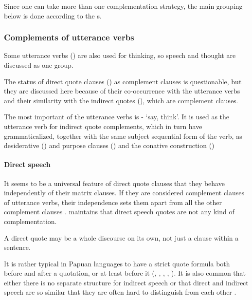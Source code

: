 Since one  can take more than one complementation strategy, the main grouping below is done according to the s.

\subsubsection{Complements of utterance verbs} \label{sec:8.3.2.1}

Some utterance verbs () are also used for thinking, so speech and thought are discussed as one group. 

The status of direct quote clauses () as complement clauses is questionable, but they are discussed here because of their co-occurrence with the utterance verbs and their similarity with the indirect quotes (), which are complement clauses.  

The most important of the utterance verbs is - `say, think'. It is used as the utterance verb for indirect quote complements, which in turn have grammaticalized, together with the same subject sequential form of the verb, as desiderative () and purpose clauses () and the conative construction () 

\paragraph[Direct speech]{Direct speech} \label{sec:8.3.2.1.1}

It seems to be a universal feature of direct quote clauses that they behave independently of their matrix clauses. If they are considered complement clauses of utterance verbs, their independence sets them apart from all the other complement clauses \citep[303]{Munro1982}. \citet[398]{Dixon2010a} maintains that direct speech quotes are not any kind of complementation.

A direct quote may be a whole discourse on its own, not just a clause within a sentence.

It is rather typical in Papuan languages to have a strict quote formula both before and after a quotation, or at least before it (\citealt[120]{Franklin1971}, \citealt[1]{Davies1981}, \citealt[12]{Roberts1987}, \citealt{Farr1999}, \citealt[128]{Hepner2002}). It is also common that either there is no separate structure for indirect speech \citep[2]{Davies1981} or that direct and indirect speech are so similar that they are often hard to distinguish from each other \citep[14]{Roberts1987}. 


